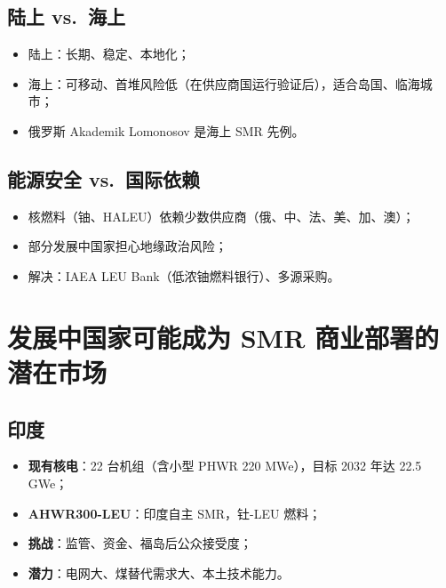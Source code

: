 \documentclass[
  UTF8,
  scheme=plain,
  fontsize=10pt,
  openany
]{ctexbook}
\begin{document}
\subsection{陆上 vs.~海上}\label{ux9646ux4e0a-vs.-ux6d77ux4e0a}

\begin{itemize}
\tightlist
\item
  陆上：长期、稳定、本地化；
\item
  海上：可移动、首堆风险低（在供应商国运行验证后），适合岛国、临海城市；
\item
  俄罗斯 Akademik Lomonosov 是海上 SMR 先例。
\end{itemize}

\subsection{能源安全
vs.~国际依赖}\label{ux80fdux6e90ux5b89ux5168-vs.-ux56fdux9645ux4f9dux8d56}

\begin{itemize}
\tightlist
\item
  核燃料（铀、HALEU）依赖少数供应商（俄、中、法、美、加、澳）；
\item
  部分发展中国家担心地缘政治风险；
\item
  解决：IAEA LEU Bank（低浓铀燃料银行）、多源采购。
\end{itemize}

\section{发展中国家可能成为 SMR
商业部署的潜在市场}\label{ux53d1ux5c55ux4e2dux56fdux5bb6ux53efux80fdux6210ux4e3a-smr-ux5546ux4e1aux90e8ux7f72ux7684ux6f5cux5728ux5e02ux573a}

\subsection{印度}\label{ux5370ux5ea6}

\begin{itemize}
\tightlist
\item
  \textbf{现有核电}：22 台机组（含小型 PHWR 220 MWe），目标 2032 年达
  22.5 GWe；
\item
  \textbf{AHWR300-LEU}：印度自主 SMR，钍-LEU 燃料；
\item
  \textbf{挑战}：监管、资金、福岛后公众接受度；
\item
  \textbf{潜力}：电网大、煤替代需求大、本土技术能力。
\end{itemize}
\end{document}
